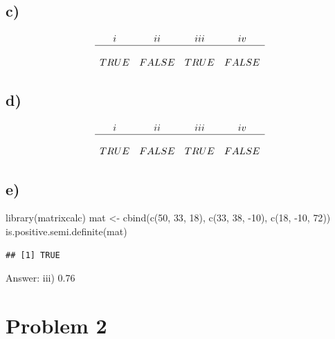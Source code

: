\documentclass[
]{article}
\newenvironment{Shaded}{\begin{snugshade}}{\end{snugshade}}
\newcommand{\DecValTok}[1]{\textcolor[rgb]{0.00,0.00,0.81}{#1}}
\newcommand{\FunctionTok}[1]{\textcolor[rgb]{0.00,0.00,0.00}{#1}}
\newcommand{\NormalTok}[1]{#1}
\newcommand{\OtherTok}[1]{\textcolor[rgb]{0.56,0.35,0.01}{#1}}
\newcommand{\SpecialCharTok}[1]{\textcolor[rgb]{0.00,0.00,0.00}{#1}}
\begin{document}
\hypertarget{c}{%
\subsection{c)}\label{c}}

\[\begin{matrix}
i & ii & iii & iv\\ 
\hline\\
TRUE & FALSE & TRUE & FALSE\\
\end{matrix}\]

\hypertarget{d}{%
\subsection{d)}\label{d}}

\[\begin{matrix}
i & ii & iii & iv\\ 
\hline\\
TRUE & FALSE & TRUE & FALSE\\
\end{matrix}\]

\hypertarget{e}{%
\subsection{e)}\label{e}}

\begin{Shaded}
\begin{Highlighting}[]
\FunctionTok{library}\NormalTok{(matrixcalc)}
\NormalTok{mat }\OtherTok{\textless{}{-}} \FunctionTok{cbind}\NormalTok{(}\FunctionTok{c}\NormalTok{(}\DecValTok{50}\NormalTok{, }\DecValTok{33}\NormalTok{, }\DecValTok{18}\NormalTok{), }\FunctionTok{c}\NormalTok{(}\DecValTok{33}\NormalTok{, }\DecValTok{38}\NormalTok{, }\SpecialCharTok{{-}}\DecValTok{10}\NormalTok{), }\FunctionTok{c}\NormalTok{(}\DecValTok{18}\NormalTok{, }\SpecialCharTok{{-}}\DecValTok{10}\NormalTok{, }\DecValTok{72}\NormalTok{))}
\FunctionTok{is.positive.semi.definite}\NormalTok{(mat)}
\end{Highlighting}
\end{Shaded}

\begin{verbatim}
## [1] TRUE
\end{verbatim}

Answer: iii) 0.76

\hypertarget{problem-2}{%
\section{Problem 2}\label{problem-2}}
\end{document}
